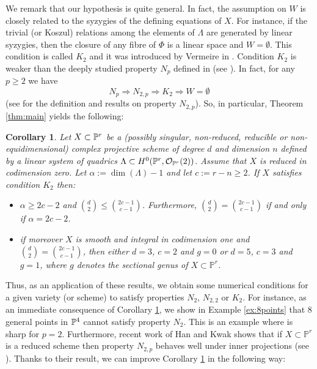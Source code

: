 \documentclass{amsart}
\newtheorem{corollary}{Corollary}
\theoremstyle{definition}
\begin{document}
We remark that our hypothesis is quite general. In fact, the
assumption on $W$ is closely related to the syzygies of the defining
equations of $X$. For instance, if the trivial (or Koszul) relations
among the elements of $\Lambda$ are generated by linear syzygies,
then the closure of any fibre of $\Phi$ is a linear space and
$W=\emptyset$. This condition is called $K_2$ and it was introduced
by Vermeire in \cite{v}. Condition $K_2$ is weaker than the deeply
studied property $N_p$ defined in \cite{g} (see \cite{v}). In fact,
for any $p\geq 2$ we have
$$N_p\Rightarrow N_{2,p}\Rightarrow
K_2\Rightarrow W=\emptyset$$ (see \cite{eghp} for the definition and
results on property $N_{2,p}$). So, in particular, Theorem
\ref{thm:main} yields the following:

\begin{corollary}\label{cor:main}
Let $X\subset\Bbb{P}^{r}$ be a (possibly singular, non-reduced,
reducible or non-equidimensional) complex projective scheme of
degree $d$ and dimension $n$ defined by a linear system of quadrics
$\Lambda\subset H^{0}(\Bbb{P}^{r},\mathcal{O}_{\Bbb{P}^{r}}(2))$.
Assume that $X$ is reduced in codimension zero. Let $\alpha:=\dim
(\Lambda)-1$ and let $c:=r-n\geq 2$. If $X$ satisfies condition
$K_{2}$ then:
\begin{itemize}
\item[(i)] $\alpha \geq 2c-2$ and $\binom{d}{2}\leq \binom{2c-1}{c-1}$. Furthermore, $\binom{d}{2}=\binom{2c-1}{c-1}$ if and only if $\alpha=2c-2$.
\item[(ii)] if moreover $X$ is smooth and integral in codimension one and $\binom{d}{2}=\binom{2c-1}{c-1}$, then
either $d=3$, $c=2$ and $g=0$ or $d=5$, $c=3$ and $g=1$, where $g$
denotes the sectional genus of $X\subset{{\mathbb P}}^r$.
\end{itemize}
\end{corollary}

Thus, as an application of these results, we obtain some numerical
conditions for a given variety (or scheme) to satisfy properties
$N_2$, $N_{2,2}$ or $K_2$. For instance, as an immediate consequence
of Corollary \ref{cor:main}, we show in Example \ref{ex:8points}
that $8$ general points in $\Bbb{P}^{4}$ cannot satisfy property
$N_2$. This is an example where \cite[Theorem 1]{gl} is sharp for
$p=2$. Furthermore, recent work of Han and Kwak shows that if
$X\subset{{\mathbb P}}^r$ is a reduced scheme then property $N_{2,p}$ behaves
well under inner projections (see \cite{h-k}). Thanks to their
result, we can improve Corollary \ref{cor:main} in the following
way:
\end{document}
